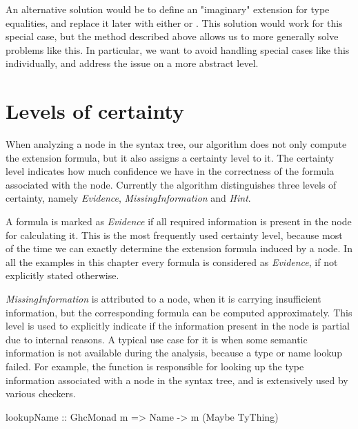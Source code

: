 \documentclass[main.tex]{subfiles}
\begin{document}
	An alternative solution would be to define an "imaginary" extension for type equalities, and replace it later with either  or . This solution would work for this special case, but the method described above allows us to more generally solve problems like this. In particular, we want to avoid handling special cases like this individually, and address the issue on a more abstract level.
	
	
	\section{Levels of certainty} \label{certainty-levels}
	
	When analyzing a node in the syntax tree, our algorithm does not only compute the extension formula, but it also assigns a certainty level to it. The certainty level indicates how much confidence we have in the correctness of the formula associated with the node. Currently the algorithm distinguishes three levels of certainty, namely \emph{Evidence}, \emph{MissingInformation} and \emph{Hint}. 
	
	A formula is marked as \emph{Evidence} if all required information is present in the node for calculating it. This is the most frequently used certainty level, because most of the time we can exactly determine the extension formula induced by a node. In all the examples in this chapter every formula is considered as \emph{Evidence}, if not explicitly stated otherwise.
	
	\emph{MissingInformation} is attributed to a node, when it is carrying insufficient information, but the corresponding formula can be computed approximately. This level is used to explicitly indicate if the information present in the node is partial due to internal reasons. A typical use case for it is when some semantic information is not available during the analysis, because a type or name lookup failed. For example, the  function is responsible for looking up the type information associated with a node in the syntax tree, and is extensively used by various checkers.
	
	\begin{oneLineHaskell}
		lookupName :: GhcMonad m => Name -> m (Maybe TyThing)
	\end{oneLineHaskell}
	
\end{document}
